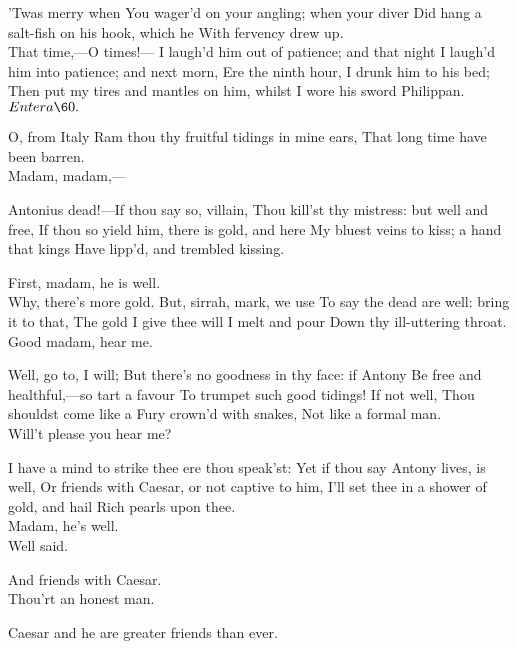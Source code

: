 \documentclass{book}
\begin{document}
\7	'Twas merry when
	You wager'd on your angling; when your diver
	Did hang a salt-fish on his hook, which he
	With fervency drew up. \\

\2	That time,---O times!---
	I laugh'd him out of patience; and that night
	I laugh'd him into patience; and next morn,
	Ere the ninth hour, I drunk him to his bed;
	Then put my tires and mantles on him, whilst
	I wore his sword Philippan. \\


	\(Enter a \60.\)

		      O, from Italy
	Ram thou thy fruitful tidings in mine ears,
	That long time have been barren. \\

	Madam, madam,---

\2	Antonius dead!---If thou say so, villain,
	Thou kill'st thy mistress: but well and free,
	If thou so yield him, there is gold, and here
	My bluest veins to kiss; a hand that kings
	Have lipp'd, and trembled kissing.

	First, madam, he is well. \\

\2	Why, there's more gold.
	But, sirrah, mark, we use
	To say the dead are well: bring it to that,
	The gold I give thee will I melt and pour
	Down thy ill-uttering throat.  \\

	Good madam, hear me.

\2	Well, go to, I will;
	But there's no goodness in thy face: if Antony
	Be free and healthful,---so tart a favour
	To trumpet such good tidings! If not well,
	Thou shouldst come like a Fury crown'd with snakes,
	Not like a formal man. \\

	Will't please you hear me?

\2	I have a mind to strike thee ere thou speak'st:
	Yet if thou say Antony lives, is well,
	Or friends with Caesar, or not captive to him,
	I'll set thee in a shower of gold, and hail
	Rich pearls upon thee. \\

	Madam, he's well. \\

\2	Well said. 

	And friends with Caesar. \\

\2	Thou'rt an honest man.

	Caesar and he are greater friends than ever.
\end{document}
